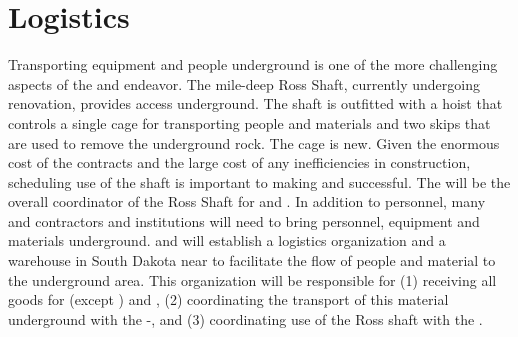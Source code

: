 \section{Logistics}
\label{sec:fdsp-tc-log}



Transporting equipment and people underground is one of the more challenging aspects of the  and  endeavor. The mile-deep Ross Shaft, currently undergoing renovation, provides access underground. The shaft is outfitted with a hoist that controls a single cage for transporting people and materials and two skips that are used to remove the underground rock. The cage is new.  Given the enormous cost of the  contracts and the large cost of any inefficiencies in construction, scheduling use of the shaft is important to making  and  successful. The     will be the overall coordinator of the Ross Shaft for  and . In addition to   personnel,  many  and  contractors and institutions  will need to bring personnel, equipment and materials underground.  and  will establish a logistics organization and a warehouse  
in South Dakota near  to facilitate the flow of people and material to the underground area. This organization will be responsible for (1) receiving all goods for  (except ) and , (2) coordinating the transport of this material underground with the -, and (3) coordinating use of the Ross shaft with the  . 

